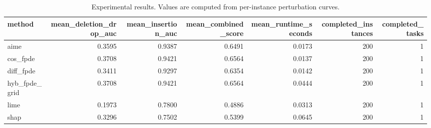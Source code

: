 \begin{table}[t]
\caption{Experimental results. Values are computed from per-instance perturbation curves.}
\label{tab:main_results_computed}
\centering
\begin{tabular}{lrrrrrr}
\toprule
method & mean\_deletion\_drop\_auc & mean\_insertion\_auc & mean\_combined\_score & mean\_runtime\_seconds & completed\_instances & completed\_tasks \\
\midrule
aime & 0.3595 & 0.9387 & 0.6491 & 0.0173 & 200 & 1 \\
cos\_fpde & 0.3708 & 0.9421 & 0.6564 & 0.0137 & 200 & 1 \\
diff\_fpde & 0.3411 & 0.9297 & 0.6354 & 0.0142 & 200 & 1 \\
hyb\_fpde\_grid & 0.3708 & 0.9421 & 0.6564 & 0.0444 & 200 & 1 \\
lime & 0.1973 & 0.7800 & 0.4886 & 0.0313 & 200 & 1 \\
shap & 0.3296 & 0.7502 & 0.5399 & 0.0645 & 200 & 1 \\
\bottomrule
\end{tabular}

\end{table}
